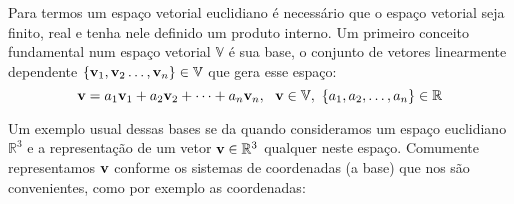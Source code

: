 Para termos um espaço vetorial euclidiano é necessário que o espaço vetorial seja finito, real e tenha nele definido um produto interno. Um primeiro conceito fundamental num espaço vetorial $\mathbb{V}$ é sua base, o conjunto de vetores linearmente dependente $\{\vb{v}_1, \vb{v}_2 \dots, \vb{v}_n\} \in \mathbb{V}$ que gera esse espaço:
    \begin{equation*}
        \vb{v} = a_1 \vb{v}_1 + a_2 \vb{v}_2 + \dots + a_n\vb{v}_n,\ \ \vb{v} \in \mathbb{V}, \ \{a_1, a_2,\dots, a_n\} \in \mathbb{R}
    \end{equation*}

Um exemplo usual dessas bases se da quando consideramos um espaço euclidiano $\mathbb{R}^3$ e a representação de um vetor $\vb{v} \in \mathbb{R}^3$ qualquer neste espaço. Comumente representamos $\vb{v}$ conforme os sistemas de coordenadas (a base) que nos são convenientes, como por exemplo as coordenadas:
    \begin{center}
    \end{center}

